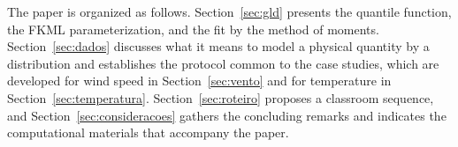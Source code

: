 The paper is organized as follows. Section~\ref{sec:gld} presents the quantile function, the FKML parameterization, and the fit by the method of moments. Section~\ref{sec:dados} discusses what it means to model a physical quantity by a distribution and establishes the protocol common to the case studies, which are developed for wind speed in Section~\ref{sec:vento} and for temperature in Section~\ref{sec:temperatura}. Section~\ref{sec:roteiro} proposes a classroom sequence, and Section~\ref{sec:consideracoes} gathers the concluding remarks and indicates the computational materials that accompany the paper.
